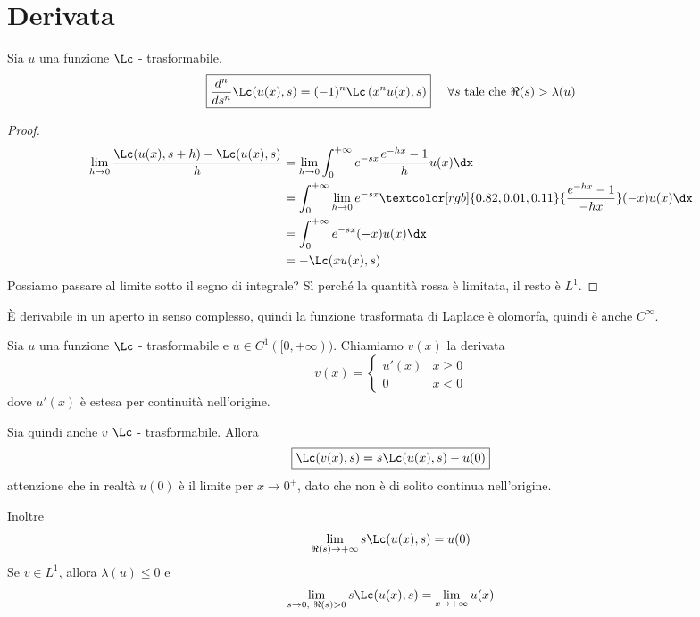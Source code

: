 \section{Derivata}
\begin{thm}
Sia $u$ una funzione $\Lc$ - trasformabile.
\begin{equation*}
\boxed{\frac{d^{n}}{ds^{n}}\Lc(u(x), s) = (- 1)^{n} \Lc\left(x^{n} u(x), s\right)} \ \ \ \ \forall s\ \text{tale che} \ \Re (s) > \lambda (u)
\end{equation*}
\end{thm}
\begin{proof}
\begin{align*}
\lim\limits_{h\rightarrow 0}\frac{\Lc(u(x), s + h) - \Lc(u(x), s)}{h} & = \lim\limits_{h\rightarrow 0}\int^{+ \infty}_{0} e^{- sx}\frac{e^{- hx} - 1}{h} u(x) \dx\\
 & = \int^{+ \infty}_{0}\lim\limits_{h\rightarrow 0} e^{- sx}\textcolor[rgb]{0.82, 0.01, 0.11}{\frac{e^{- hx} - 1}{- hx}}(- x) u(x) \dx\\
 & = \int^{+ \infty}_{0} e^{- sx}(- x) u(x) \dx\\
 & = - \Lc(xu(x), s)
\end{align*}
Possiamo passare al limite sotto il segno di integrale? Sì perché la quantità rossa è limitata, il resto è $L^{1}$.
\end{proof}

È derivabile in un aperto in senso complesso, quindi la funzione trasformata di Laplace è olomorfa, quindi è anche $C^{\infty}$.
\begin{thm}
Sia $u$ una funzione $\Lc$ - trasformabile e $u\in C^{1}([0, + \infty))$. Chiamiamo $v(x)$ la derivata
\begin{equation*}
v(x) =
\begin{cases}
u'(x) & x \geq 0\\
0 & x < 0
\end{cases}
\end{equation*}
dove $u'(x)$ è estesa per continuità nell'origine.

Sia quindi anche $v$ $\Lc$ - trasformabile. Allora
\begin{equation*}
\boxed{\Lc(v(x), s) = s\Lc(u(x), s) - u(0)}
\end{equation*}
attenzione che in realtà $u(0)$ è il limite per $x\rightarrow 0^{+}$, dato che non è di solito continua nell'origine.

Inoltre
\begin{equation*}
\lim_{\Re (s)\rightarrow + \infty} s\Lc(u(x), s) = u(0)
\end{equation*}
Se $v\in L^{1}$, allora $\lambda (u) \leq 0$ e
\begin{equation*}
\lim\limits_{s\rightarrow 0, \ \Re (s) > 0} s\Lc(u(x), s) = \lim_{x\rightarrow + \infty} u(x)
\end{equation*}
\end{thm}

